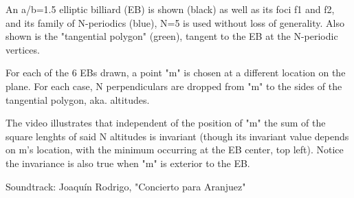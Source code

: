 An a/b=1.5 elliptic billiard (EB) is shown (black) as well as its foci f1 and f2, and its family of N-periodics (blue), N=5 is used without loss of generality. Also shown is the "tangential polygon" (green), tangent to the EB at the N-periodic vertices. 

For each of the 6 EBs drawn, a point "m" is chosen at a different location on the plane. For each case, N perpendiculars are dropped from "m" to the sides of the tangential polygon, aka. altitudes.

The video illustrates that independent of the position of "m" the sum of the square lenghts of said N altitudes is invariant (though its invariant value depends on m's location, with the minimum occurring at the EB center, top left). Notice the invariance is also true when "m" is exterior to the EB.

Soundtrack: Joaquín Rodrigo, "Concierto para Aranjuez"